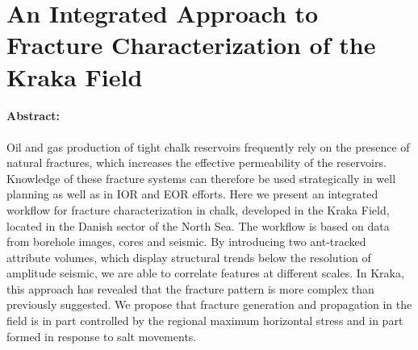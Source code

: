 \section{An Integrated Approach to Fracture Characterization of the Kraka Field}
\label{seg:tala}

\paragraph{Abstract:} Oil and gas production of tight chalk reservoirs frequently rely on the presence of natural fractures, which increases the effective permeability of the reservoirs.  Knowledge of these fracture systems can therefore be used strategically in well planning as well as in IOR and EOR efforts.  Here we present an integrated workflow for fracture characterization in chalk, developed in the Kraka Field, located in the Danish sector of the North Sea.  The workflow is based on data from borehole images, cores and seismic.  By introducing two ant-tracked attribute volumes, which display structural trends below the resolution of amplitude seismic, we are able to correlate features at different scales.  In Kraka, this approach has revealed that the fracture pattern is more complex than previously suggested.  We propose that fracture generation and propagation in the field is in part controlled by the regional maximum horizontal stress and in part formed in response to salt movements.

{\vfill\hfill\newline{}}


